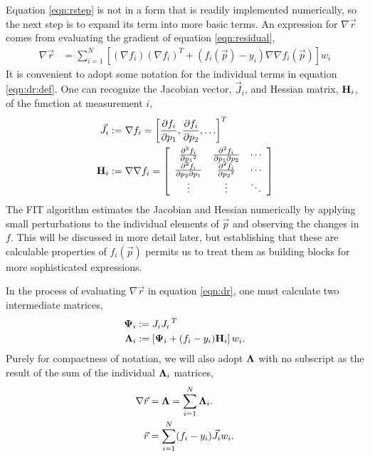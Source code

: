 \documentclass{article}
\def\p{\vec{p}}
\def\r{\vec{r}}
\def\J{\vec{J}}
\def\H{{\bf H}}
\def\LAM{{\bf \Lambda}}
\def\PSI{{\bf \Psi}}
\begin{document}
Equation \ref{eqn:rstep} is not in a form that is readily implemented numerically, so the next step is to expand its term into more basic terms.  An expression for $\nabla \r$ comes from evaluating the gradient of equation \ref{eqn:residual},
\begin{align}
\nabla \r &= \sum_{i=1}^N \left[(\nabla f_i)(\nabla f_i)^T + (f_i(\p) - y_i) \nabla\nabla f_i(\p)\right] w_i\label{eqn:dr:def}
\end{align}
It is convenient to adopt some notation for the individual terms in equation \ref{eqn:dr:def}.  One can recognize the Jacobian vector, $\J_i$, and Hessian matrix, $\H_i$, of the function at measurement $i$,
\def\arraystretch{2}
\begin{align}
\J_i &:= \nabla f_i = \left[\frac{\partial f_i}{\partial p_1}, \frac{\partial f_i}{\partial p_2}, \ldots \right]^T\label{eqn:jacobian}\\
\H_i &:= \nabla \nabla f_i =\left[ 
\begin{array}{ccc}
\frac{\partial^2 f_i}{\partial p_1{^2}} & \frac{\partial^2 f_i}{\partial p_1 \partial p_2} & \cdots \\
\frac{\partial^2 f_i}{\partial p_2 \partial p_1} & \frac{\partial^2 f_i}{\partial p_2{^2}} & \cdots \\
\vdots & \vdots & \ddots
\end{array}
\right]\label{eqn:hessian}
\end{align}
The FIT algorithm estimates the Jacobian and Hessian numerically by applying small perturbations to the individual elements of $\p$ and observing the changes in $f$.  This will be discussed in more detail later, but establishing that these are calculable properties of $f_i(\p)$ permits us to treat them as building blocks for more sophisticated expressions.

In the process of evaluating $\nabla \r$ in equation \ref{eqn:dr}, one must calculate two intermediate matrices,
\begin{align}
\PSI_i &:= J_i J_i\,^T\label{eqn:psi}\\
\LAM_i &:= \left[\PSI_i + (f_i - y_i) \H_i\right]w_i.\label{eqn:lam}
\end{align}
Purely for compactness of notation, we will also adopt $\LAM$ with no subscript as the result of the sum of the individual $\LAM_i$ matrices,
\begin{align}
\nabla \r &= \LAM = \sum_{i=1}^N \LAM_i.\label{eqn:dr}\\
\r &= \sum_{i=1}^N (f_i - y_i) \J_i w_i.\label{eqn:r}
\end{align}
\end{document}
